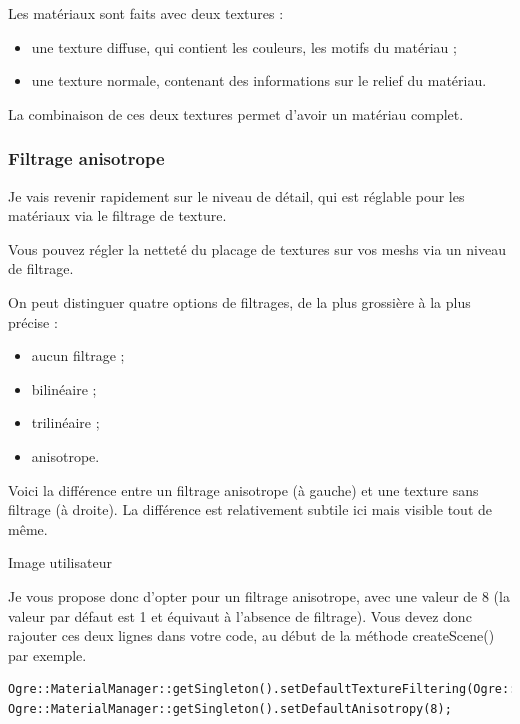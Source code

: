 Les matériaux sont faits avec deux textures :

\begin{itemize}
\item une texture diffuse, qui contient les couleurs, les motifs du matériau ;
\item une texture normale, contenant des informations sur le relief du matériau.
\end{itemize}
   

La combinaison de ces deux textures permet d'avoir un matériau complet.



\subsubsection{Filtrage anisotrope}


Je vais revenir rapidement sur le niveau de détail, qui est réglable pour les matériaux via le filtrage de texture.

Vous pouvez régler la netteté du placage de textures sur vos meshs via un niveau de filtrage.

On peut distinguer quatre options de filtrages, de la plus grossière à la plus précise :

\begin{itemize}
\item aucun filtrage ;
\item bilinéaire ;
\item trilinéaire ;
\item anisotrope.
\end{itemize}


Voici la différence entre un filtrage anisotrope (à gauche) et une texture sans filtrage (à droite). La différence est relativement subtile ici mais visible tout de même.

Image utilisateur

Je vous propose donc d'opter pour un filtrage anisotrope, avec une valeur de 8 (la valeur par défaut est 1 et équivaut à l'absence de filtrage). Vous devez donc rajouter ces deux lignes dans votre code, au début de la méthode createScene() par exemple.

\begin{lstlisting}[caption={Choix d'un filtrage anisotrope}]
Ogre::MaterialManager::getSingleton().setDefaultTextureFiltering(Ogre::TFO\_ANISOTROPIC);
Ogre::MaterialManager::getSingleton().setDefaultAnisotropy(8);
\end{lstlisting}

